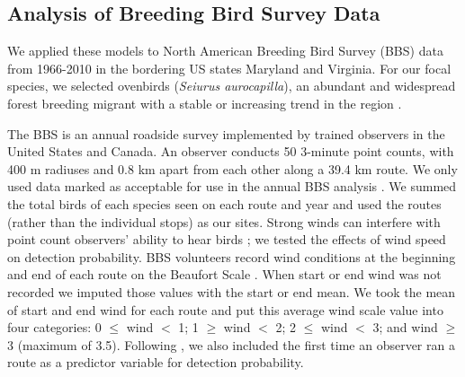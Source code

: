 \documentclass[12pt]{article}
\begin{document}

\subsection{Analysis of Breeding Bird Survey Data}

We applied these models to North American Breeding Bird Survey
(BBS) data from 1966-2010 in the bordering US states
Maryland and Virginia. For our focal species, we selected
ovenbirds (\textit{Seiurus aurocapilla}), an abundant and widespread
forest breeding migrant with a stable or increasing trend in the region \citep{porneluzi_etal:2011}.

The BBS is an annual roadside survey implemented by trained
observers in the United States and Canada. An observer conducts 50
3-minute point counts, with 400 m radiuses and 0.8 km apart from each other along a
39.4 km route. We only used data marked as acceptable for use in the annual BBS
analysis \citep{sauer_etal:1994auk}.  We summed the total birds of each
species seen on each route and year and used the routes (rather
than the individual stops) as our sites.
Strong winds can interfere with point count observers' ability
to hear birds \citep{simons_etal:2007}; we tested the effects of wind
speed on detection probability. BBS volunteers record wind conditions
at the beginning and end of each route on the Beaufort Scale
\citep[start and end wind]{robbins_etal:1986}.
When start or end wind was not recorded we imputed those values with
the start or end mean. We took the mean of start and end wind for
each route and put this average wind scale value into four
categories: 0 $\leq$ wind $<$ 1; 1 $\geq$ wind $<$ 2; 2 $\leq$ wind $<$ 3; and wind
$\geq$ 3 (maximum of 3.5).
Following \citet{link_sauer:2002},
we also included the first time an observer ran a route as a predictor variable for detection
probability.
\end{document}
